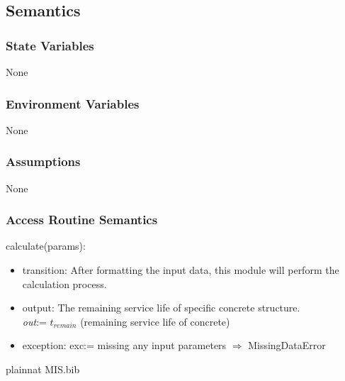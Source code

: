 \documentclass[12pt, titlepage]{article}
\begin{document}
\subsection{Semantics}

\subsubsection{State Variables}

None

\subsubsection{Environment Variables}

None

\subsubsection{Assumptions}

None

\subsubsection{Access Routine Semantics}

calculate(params):
\begin{itemize}
\item transition: After formatting the input data, this module will perform the calculation process.
\item output: The remaining service life of specific concrete structure.\\
\textit{out}:= $t_{remain}$ (remaining service life of concrete)
\item exception: exc:= missing any input parameters $\Longrightarrow$ MissingDataError
\end{itemize}
\newpage
 {plainnat}
 {MIS.bib}

\newpage
\end{document}
